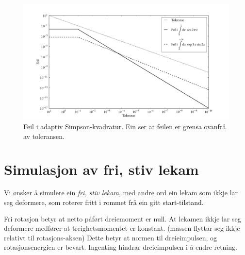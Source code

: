 \documentclass[12pt]{article}
\begin{document}
\begin{multicols*}{2}
\begin{figure}[H]
    \centering
    \includegraphics[width=\columnwidth]{simp_err}
    \caption{Feil i adaptiv Simpson-kvadratur.
    Ein ser at feilen er grensa ovanfrå av toleransen.}
\end{figure}



    \section{Simulasjon av fri, stiv lekam}
    Vi ønsker å simulere ein {\em fri, stiv lekam},
    med andre ord ein lekam som ikkje lar seg deformere,
    som roterer fritt i rommet frå ein gitt start-tilstand.

    Fri rotasjon betyr at netto påført dreiemoment er null.
    At lekamen ikkje lar seg deformere medfører at
    treighetsmomentet er konstant. (massen flyttar seg ikkje relativt
    til rotasjons-aksen)
    Dette betyr at normen til dreieimpulsen, og rotasjonsenergien er bevart. \cite{lien}
    Ingenting hindrar dreieimpulsen i å endre retning.


\end{multicols*}
\end{document}
